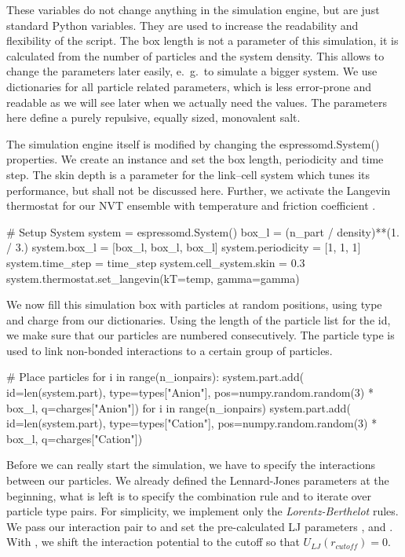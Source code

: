 \documentclass[
a4paper,                        %
11pt,                           %
twoside,                        %
footsepline,                    %
headsepline,                    %
headexclude,                    %
footexclude,                    %
pagesize,                       %
]{scrartcl}
\begin{document}
These variables do not change anything in the simulation engine, but
are just standard Python variables. They are used to increase the
readability and flexibility of the script. The box length is not a
parameter of this simulation, it is calculated from the number of
particles and the system density. This allows to change the parameters
later easily, e.~g.\ to simulate a bigger system.
We use dictionaries for all particle related parameters, which is less error-prone and
readable as we will see later when we actually need the values. The parameters here define a purely repulsive, 
equally sized, monovalent salt.

The simulation engine itself is modified by changing the
espressomd.System() properties. We create an instance  and
set the box length, periodicity and time step. The skin depth  
is a parameter for the link--cell system which tunes its
performance, but shall not be discussed here. Further, we activate the Langevin thermostat
for our NVT ensemble with temperature  and friction coefficient . 


\begin{pypresso}
# Setup System
system = espressomd.System()
box_l = (n_part / density)**(1. / 3.)
system.box_l = [box_l, box_l, box_l]
system.periodicity = [1, 1, 1]
system.time_step = time_step
system.cell_system.skin = 0.3
system.thermostat.set_langevin(kT=temp, gamma=gamma)
\end{pypresso}

We now fill this simulation box with particles at random positions, using type and charge from our dictionaries.
Using the length of the particle list  for the id, we make sure that our particles are numbered consecutively.
The particle type is used to link non-bonded interactions to a certain group of particles.

\begin{pypresso}
# Place particles
for i in range(n_ionpairs):
    system.part.add(
            id=len(system.part), 
            type=types["Anion"],  
            pos=numpy.random.random(3) * box_l, 
            q=charges["Anion"])
for i in range(n_ionpairs)
    system.part.add(
            id=len(system.part), 
            type=types["Cation"], 
            pos=numpy.random.random(3) * box_l, 
            q=charges["Cation"])
\end{pypresso}

Before we can really start the simulation, we have to specify the
interactions between our particles. We already defined the Lennard-Jones parameters at the beginning,
what is left is to specify the combination rule and to iterate over particle type pairs. For simplicity, 
we implement only the \emph{Lorentz-Berthelot} rules. 
We pass our interaction pair to  and set the 
pre-calculated LJ parameters ,  and . With ,
we shift the interaction potential to the cutoff so that $U_{LJ}(r_{cutoff})=0$.
\end{document}
